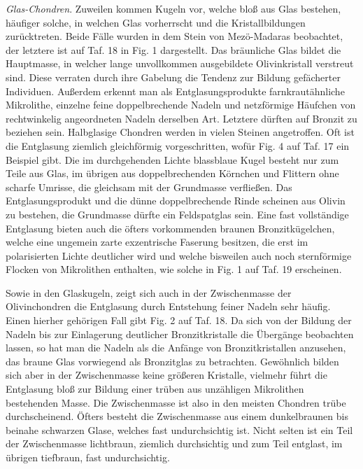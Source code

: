 \documentclass[a4paper, 12pt, oneside]{article}
\begin{document}
\emph{Glas-Chondren}. Zuweilen kommen Kugeln vor, welche bloß aus Glas bestehen, häufiger solche, in welchen Glas vorherrscht und die Kristallbildungen zurücktreten. Beide Fälle wurden in dem Stein von Mezö-Madaras beobachtet, der letztere ist auf Taf. 18 in Fig. 1 dargestellt. Das bräunliche Glas bildet die Hauptmasse, in welcher lange unvollkommen ausgebildete Olivinkristall verstreut sind. Diese verraten durch ihre Gabelung die Tendenz zur Bildung gefächerter Individuen. Außerdem erkennt man als Entglasungsprodukte farnkrautähnliche Mikrolithe, einzelne feine doppelbrechende Nadeln und netzförmige Häufchen von rechtwinkelig angeordneten Nadeln derselben Art. Letztere dürften auf Bronzit zu beziehen sein. Halbglasige Chondren werden in vielen Steinen angetroffen. Oft ist die Entglasung ziemlich gleichförmig vorgeschritten, wofür Fig. 4 auf Taf. 17 ein Beispiel gibt. Die im durchgehenden Lichte blassblaue Kugel besteht nur zum Teile aus Glas, im übrigen aus doppelbrechenden Körnchen und Flittern ohne scharfe Umrisse, die gleichsam mit der Grundmasse verfließen. Das Entglasungsprodukt und die dünne doppelbrechende Rinde scheinen aus Olivin zu bestehen, die Grundmasse dürfte ein Feldspatglas sein. Eine fast vollständige Entglasung bieten auch die öfters vorkommenden braunen Bronzitkügelchen, welche eine ungemein zarte exzentrische Faserung besitzen, die erst im polarisierten Lichte deutlicher wird und welche bisweilen auch noch sternförmige Flocken von Mikrolithen enthalten, wie solche in Fig. 1 auf Taf. 19 erscheinen.

Sowie in den Glaskugeln, zeigt sich auch in der Zwischenmasse der Olivinchondren die Entglasung durch Entstehung feiner Nadeln sehr häufig. Einen hierher gehörigen Fall gibt Fig. 2 auf Taf. 18. Da sich von der Bildung der Nadeln bis zur Einlagerung deutlicher Bronzitkristalle die Übergänge beobachten lassen, so hat man die Nadeln als die Anfänge von Bronzitkristallen anzusehen, das braune Glas vorwiegend als Bronzitglas zu betrachten. Gewöhnlich bilden sich aber in der Zwischenmasse keine größeren Kristalle, vielmehr führt die Entglasung bloß zur Bildung einer trüben aus unzähligen Mikrolithen bestehenden Masse. Die Zwischenmasse ist also in den meisten Chondren trübe durchscheinend. Öfters besteht die Zwischenmasse aus einem dunkelbraunen bis beinahe schwarzen Glase, welches fast undurchsichtig ist. Nicht selten ist ein Teil der Zwischenmasse lichtbraun, ziemlich durchsichtig und zum Teil entglast, im übrigen tiefbraun, fast undurchsichtig.
\end{document}
